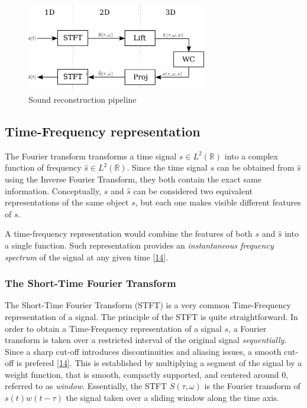 \documentclass[american,]{article}
\theoremstyle{definition}
\theoremstyle{definition}
\theoremstyle{definition}
\theoremstyle{remark}
\begin{document}
\begin{figure}
\centering
\includegraphics[width=0.7\textwidth,height=\textheight]{img/pipeline.png}
\caption{Sound reconstruction pipeline}
\end{figure}

\hypertarget{time-frequency-representation}{%
\subsection{Time-Frequency representation}\label{time-frequency-representation}}

The Fourier transform transforms a time signal \(s\in L^2(\mathbb{R})\)
into a complex function of frequency \(\hat s\in L^2(\mathbb{R})\).
Since the time signal \(s\) can be obtained from \(\hat s\)
using the Inverse Fourier Transform, they both contain
the exact same information.
Conceptually, \(s\) and \(\hat s\) can be considered two equivalent
representations of the same object \(s\), but each one
makes visible different features of \(s\).

A time-frequency representation would combine the features
of both \(s\) and \(\hat s\) into a single function.
Such representation provides an \emph{instantaneous frequency spectrum}
of the signal at any given time {[}\protect\hyperlink{ref-grochenig2001}{14}{]}.

\hypertarget{the-short-time-fourier-transform}{%
\subsubsection{The Short-Time Fourier Transform}\label{the-short-time-fourier-transform}}

The Short-Time Fourier Transform (STFT) is a very common
Time-Frequency representation of a signal.
The principle of the STFT is quite straightforward.
In order to obtain a Time-Frequency representation of a signal \(s\),
a Fourier transform is taken over a restricted interval
of the original signal \emph{sequentially}.
Since a sharp cut-off introduces discontinuities and aliasing issues,
a smooth cut-off is prefered {[}\protect\hyperlink{ref-grochenig2001}{14}{]}.
This is established by multiplying a segment of the signal by a weight function,
that is smooth, compactly supported, and centered around \(0\),
referred to as \emph{window}.
Essentially, the STFT \(S(\tau,\omega)\) is the Fourier transform of \(s(t)w(t-\tau)\)
the signal taken over a sliding window along the time axis.
\end{document}
